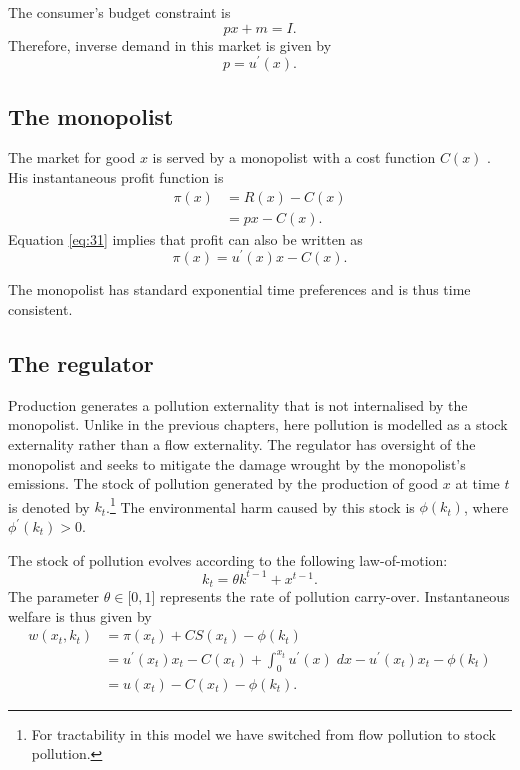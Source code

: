 The consumer's budget constraint is 
\begin{equation}
px+m=I.  \label{eq:28}
\end{equation}%
Therefore, inverse demand in this market is given by 
\begin{equation}
p=u^{\prime }(x).  \label{eq:31}
\end{equation}

\subsection{The monopolist}

\label{sec:monopolist}

The market for good $x$ is served by a monopolist with a cost function $C(x)$%
. His instantaneous profit function is 
\begin{align}
\pi (x)& =R(x)-C(x)  \label{eq:32} \\
& =px-C(x).
\end{align}%
Equation \eqref{eq:31} implies that profit can also be written as 
\begin{equation}
\pi (x)=u^{\prime }(x)x-C(x).  \label{eq:81}
\end{equation}

The monopolist has standard exponential time preferences and is thus time
consistent.

\subsection{The regulator}

\label{sec:regulator}

Production generates a pollution externality that is not internalised by the
monopolist. Unlike in the previous chapters, here pollution is modelled as a
stock externality rather than a flow externality. The regulator has
oversight of the monopolist and seeks to mitigate the damage wrought by the
monopolist's emissions. The stock of pollution generated by the production
of good $x$ at time $t$ is denoted by $k_{t}$.\footnote{%
For tractability in this model we have switched from flow pollution to stock
pollution.} The environmental harm caused by this stock is $\phi (k_{t})$,
where $\phi ^{\prime }(k_{t})>0$.

The stock of pollution evolves according to the following law-of-motion: 
\begin{equation}
k_{t}=\theta k^{t-1}+x^{t-1}.  \label{eq:33}
\end{equation}%
The parameter $\theta \in \lbrack 0,1]$ represents the rate of pollution
carry-over. Instantaneous welfare is thus given by 
\begin{align}
w(x_{t},k_{t})& =\pi (x_{t})+CS(x_{t})-\phi (k_{t})  \label{eq:83} \\
& =u^{\prime }(x_{t})x_{t}-C(x_{t})+\int_{0}^{x_{t}}u^{\prime
}(x)\;dx-u^{\prime }(x_{t})x_{t}-\phi (k_{t}) \\
& =u(x_{t})-C(x_{t})-\phi (k_{t}).
\end{align}

